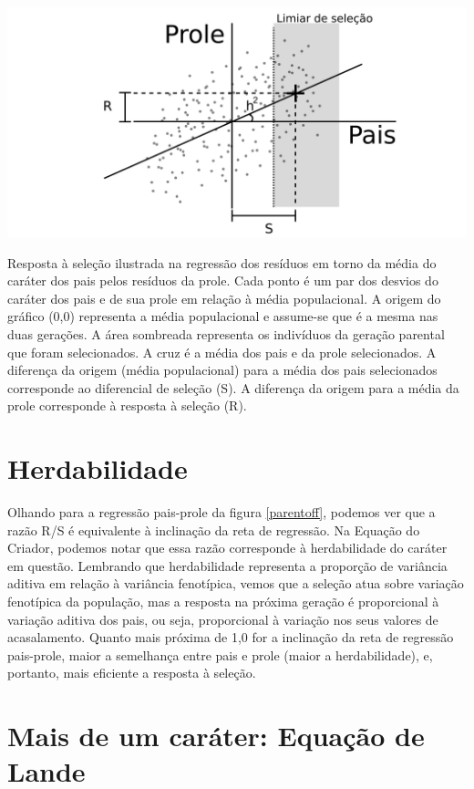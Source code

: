\documentclass[portuges,]{tufte-handout}
\begin{document}
\begin{marginfigure}
\includegraphics{./figuras/parent-offspring.png}
\caption{Resposta à seleção ilustrada na regressão dos resíduos
em torno da média do caráter dos pais pelos resíduos da prole. Cada
ponto é um par dos desvios do caráter dos pais e de sua prole em relação
à média populacional. A origem do gráfico (0,0) representa a média
populacional e assume-se que é a mesma nas duas gerações. A área
sombreada representa os indivíduos da geração parental que foram
selecionados. A cruz é a média dos pais e da prole selecionados. A
diferença da origem (média populacional) para a média dos pais
selecionados corresponde ao diferencial de seleção (S). A diferença da
origem para a média da prole corresponde à resposta à seleção (R).}
\label{parentoff}
\end{marginfigure}

\section{Herdabilidade}\label{herdabilidade}

Olhando para a regressão pais-prole da figura \ref{parentoff}, podemos
ver que a razão R/S é equivalente à inclinação da reta de regressão. Na
Equação do Criador, podemos notar que essa razão corresponde à
herdabilidade do caráter em questão. Lembrando que herdabilidade
representa a proporção de variância aditiva em relação à variância
fenotípica, vemos que a seleção atua sobre variação fenotípica da
população, mas a resposta na próxima geração é proporcional à variação
aditiva dos pais, ou seja, proporcional à variação nos seus valores de
acasalamento. Quanto mais próxima de 1,0 for a inclinação da reta de
regressão pais-prole, maior a semelhança entre pais e prole (maior a
herdabilidade), e, portanto, mais eficiente a resposta à seleção.

\section{Mais de um caráter: Equação de
Lande}\label{mais-de-um-caruxe1ter-equauxe7uxe3o-de-lande}
\end{document}
